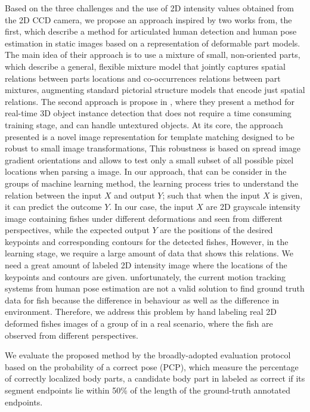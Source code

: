 Based on the three challenges and the use of 2D intensity values obtained from the
2D CCD camera, we propose an approach inspired by two works from, the first, 
\citet{ramanan2012} which describe a method for articulated human detection
and human pose estimation in static images based on a representation of deformable 
part models. The main idea of their approach is to use a mixture of small, non-oriented 
parts, which describe a general, flexible mixture model that jointly captures spatial 
relations between parts locations and co-occurrences relations between part mixtures, 
augmenting standard pictorial structure models that encode just spatial relations. 
The second approach is propose in \citet{Hinterstoisser2012}, where they present 
a method for real-time 3D object instance detection that does not require a time 
consuming training stage, and can handle untextured objects. At its core, the approach 
presented is a novel image representation for template matching designed to be robust 
to small image transformations, This robustness is based on spread image gradient 
orientations and allows to test only a small subset of all possible pixel locations 
when parsing a image.
In our approach, that can be consider in the groups of machine learning method, 
the learning process tries to understand the relation between the input $X$
and output $Y$; such that when the input $X$ is given, it can predict the outcome $Y$.
In our case, the input $X$ are 2D grayscale intensity image containing fishes under
different deformations and seen from different perspectives, while the expected output
$Y$ are the positions of the desired keypoints and corresponding contours for the detected
fishes, However, in the learning stage, we require a large amount of data that shows
this relations. We need a great amount of labeled 2D intensity image where the locations
of the keypoints and contours are given. unfortunately, the current motion tracking systems
from human pose estimation are not a valid solution to find ground truth data for fish
because the difference in behaviour as well as the difference in environment. Therefore,
we address this problem by hand labeling real 2D deformed fishes images of a group of in a real
scenario, where the fish are observed from different perspectives.



We evaluate the proposed method by the broadly-adopted evaluation protocol based on the probability of 
a correct pose (PCP), which measure the percentage of correctly localized body parts, 
a candidate body part in labeled as correct if its segment endpoints lie within 50\% of the length
of the ground-truth annotated endpoints.



